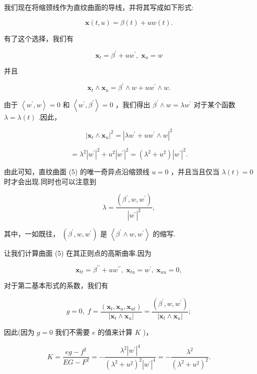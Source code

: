 我们现在将缩颈线作为直纹曲面的导线，并将其写成如下形式:

\[
\mathbf{x}\left( {t,u}\right)  = \beta \left( t\right)  + {uw}\left( t\right) . \tag{5}
\]

有了这个选择，我们有

\[
{\mathbf{x}}_{t} = {\beta }^{\prime } + u{w}^{\prime },\;{\mathbf{x}}_{u} = w
\]

并且

\[
{\mathbf{x}}_{t} \land  {\mathbf{x}}_{u} = {\beta }^{\prime } \land  w + u{w}^{\prime } \land  w.
\]

由于 \(\left\langle  {{w}^{\prime },w}\right\rangle   = 0\) 和 \(\left\langle  {{w}^{\prime },{\beta }^{\prime }}\right\rangle   = 0\) ，我们得出 \({\beta }^{\prime } \land  w = \lambda {w}^{\prime }\) 对于某个函数 \(\lambda  = \lambda \left( t\right)\) .因此，

\[
{\left| {\mathbf{x}}_{t} \land  {\mathbf{x}}_{u}\right| }^{2} = {\left| \lambda {w}^{\prime } + u{w}^{\prime } \land  w\right| }^{2}
\]

\[
= {\lambda }^{2}{\left| {w}^{\prime }\right| }^{2} + {u}^{2}{\left| {w}^{\prime }\right| }^{2} = \left( {{\lambda }^{2} + {u}^{2}}\right) {\left| {w}^{\prime }\right| }^{2}.
\]

由此可知，直纹曲面 (5) 的唯一奇异点沿缩颈线 \(u = 0\) ，并且当且仅当 \(\lambda \left( t\right)  = 0\) 时才会出现.同时也可以注意到

\[
\lambda  = \frac{\left( {\beta }^{\prime },w,{w}^{\prime }\right) }{{\left| {w}^{\prime }\right| }^{2}},
\]

其中，一如既往， \(\left( {{\beta }^{\prime },w,{w}^{\prime }}\right)\) 是 \(\left\langle  {{\beta }^{\prime } \land  w,{w}^{\prime }}\right\rangle\) 的缩写.

让我们计算曲面 (5) 在其正则点的高斯曲率.因为

\[
{\mathbf{x}}_{tt} = {\beta }^{\prime \prime } + u{w}^{\prime \prime },\;{\mathbf{x}}_{tu} = {w}^{\prime },\;{\mathbf{x}}_{uu} = 0,
\]

对于第二基本形式的系数，我们有

\[
g = 0,\;f = \frac{\left( {\mathbf{x}}_{t},{\mathbf{x}}_{u},{\mathbf{x}}_{ut}\right) }{\left| {\mathbf{x}}_{t} \land  {\mathbf{x}}_{u}\right| } = \frac{\left( {\beta }^{\prime },w,{w}^{\prime }\right) }{\left| {\mathbf{x}}_{t} \land  {\mathbf{x}}_{u}\right| };
\]

因此(因为 \(g = 0\) 我们不需要 \(e\) 的值来计算 \(K\) )，

\[
K = \frac{{eg} - {f}^{2}}{{EG} - {F}^{2}} =  - \frac{{\lambda }^{2}{\left| {w}^{\prime }\right| }^{4}}{{\left( {\lambda }^{2} + {u}^{2}\right) }^{2}{\left| {w}^{\prime }\right| }^{4}} =  - \frac{{\lambda }^{2}}{{\left( {\lambda }^{2} + {u}^{2}\right) }^{2}}. \tag{6}
\]

